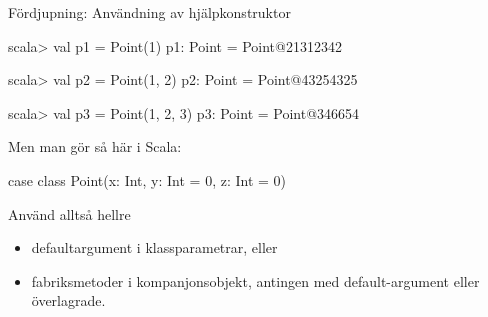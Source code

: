 \begin{Slide}{Fördjupning: Användning av hjälpkonstruktor}
\begin{REPL}
scala> val p1 = Point(1)
p1: Point = Point@21312342

scala> val p2 = Point(1, 2)
p2: Point = Point@43254325

scala> val p3 = Point(1, 2, 3)
p3: Point = Point@346654
\end{REPL}
\pause
Men man gör  så här i Scala:
\begin{Code}[basicstyle=\ttfamily\SlideFontSize{8.5}{12}]
case class Point(x: Int, y: Int = 0, z: Int = 0)
\end{Code}
Använd alltså hellre 
\begin{itemize}
  \item defaultargument i klassparametrar, eller
  \item fabriksmetoder i kompanjonsobjekt, antingen med default-argument eller överlagrade. 
\end{itemize}

\end{Slide}



%
%
%
%
%



